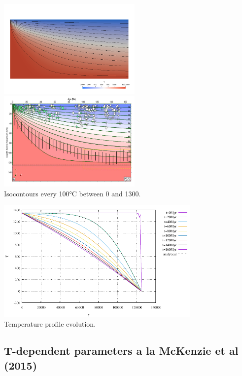 \begin{center}
\includegraphics[width=7cm]{python_codes/fieldstone_83/results_model1/T}
\includegraphics[width=7cm]{python_codes/fieldstone_83/results_model1/comparison}\\
{\captionfont Isocontours every 100$\si{\celsius}$ between 0 and 1300.}
\end{center}

\begin{center}
\includegraphics[width=10cm]{python_codes/fieldstone_83/results_model1/Tprofiles}\\
{\captionfont Temperature profile evolution.} 
\end{center}



\subsection*{T-dependent parameters a la McKenzie et al (2015)}

